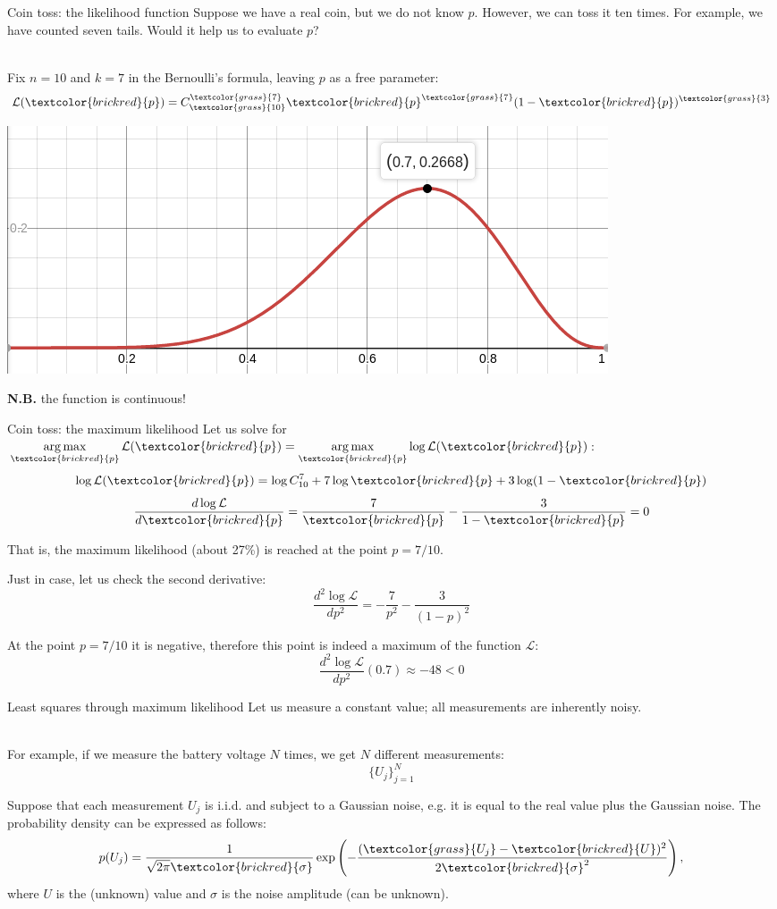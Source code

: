 \documentclass[UKenglish,aspectratio=169]{beamer}
\DeclareMathOperator*{\argmax}{arg\,max}
\newcommand\unknown[1]{\textcolor{brickred}{#1}}
\newcommand\known[1]{\textcolor{grass}{#1}}
\begin{document}
\begin{frame}{Coin toss: the likelihood function}
Suppose we have a real coin, but we do not know $p$.
However, we can toss it ten times. For example, we have counted seven tails.
Would it help us to evaluate $p$?

\pause
~\\
Fix $n=10$ and $k=7$ in the Bernoulli's formula, leaving $p$ as a free parameter:
$$\mathcal{L}(\unknown{p}) = C_{\known{10}}^{\known{7}} \unknown{p}^{\known{7}} (1-\unknown{p})^{\known{3}}$$

\pause
\begin{center}
\includegraphics[width=.5\columnwidth]{../manuscript/img/likehood-07.png}
\end{center}
\textbf{N.B.} the function is continuous!
\end{frame}

\begin{frame}{Coin toss: the maximum likelihood}
Let us solve for $\argmax\limits_{\unknown{p}} \mathcal L(\unknown{p}) = \argmax\limits_{\unknown{p}} \log\mathcal{L}(\unknown{p})$:
\pause
$$\log \mathcal{L}(\unknown{p}) = \log C_{10}^7 + 7 \log \unknown{p} + 3\log (1-\unknown{p})$$
\pause
$$\frac{d \log \mathcal{L}}{d\unknown{p}} = \frac{7}{\unknown{p}} - \frac{3}{1-\unknown{p}} = 0$$

\pause
That is, the maximum likelihood (about 27\%) is reached at the point $p=7/10$.

\pause
Just in case, let us check the second derivative:
$$\frac{d^2 \log \mathcal{L}}{dp^2} = -\frac{7}{p^2} - \frac{3}{(1-p)^2}$$

At the point $p=7/10$ it is negative, therefore this point is indeed a maximum of the function $\mathcal{L}$:
$$\frac{d^2 \log \mathcal{L}}{dp^2}(0.7)  \approx -48 < 0$$
\end{frame}

\begin{frame}{Least squares through maximum likelihood}
Let us measure a constant value; all measurements are inherently noisy.

~\\

For example, if we measure the battery voltage $N$ times, we get $N$ different measurements:
$$
\{U_j\}_{j=1}^{N}
$$

Suppose that each measurement $U_j$ is i.i.d. and subject to a Gaussian noise, e.g. it is equal to the real value plus the Gaussian noise.
The probability density can be expressed as follows:
$$
p(U_j) = \frac{1}{\sqrt{2\pi}\unknown{\sigma}} \exp\left(-\frac{(\known{U_j}-\unknown{U})^2}{2\unknown{\sigma}^2}\right),
$$
where $U$ is the (unknown) value and $\sigma$ is the noise amplitude (can be unknown).
\end{frame}
\end{document}
